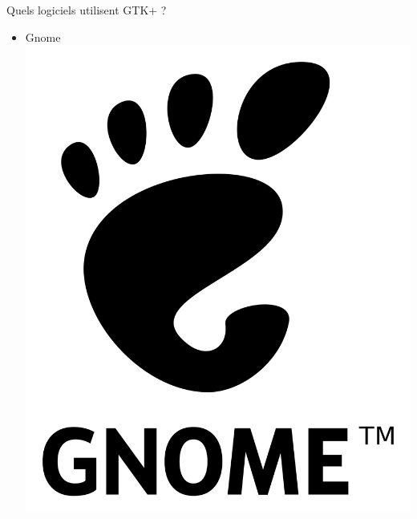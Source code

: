 \documentclass{beamer}
\begin{document}
\begin{frame}{Quels logiciels utilisent GTK+ ?}
	\begin{itemize}
	\item Gnome  \linebreak  \includegraphics[scale=0.01]{Pictures/GNOME.png}  \pause

\end{itemize}
\end{frame}
\end{document}
